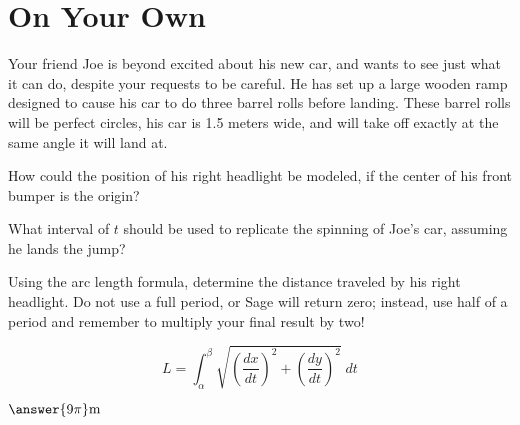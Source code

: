 \documentclass{ximera}
\begin{document}
\section{On Your Own}
\begin{question}
\item Your friend Joe is beyond excited about his new car, and wants to see just what it can do, despite your requests to be careful. He has set up a large wooden ramp designed to cause his car to do three barrel rolls before landing. These barrel rolls will be perfect circles, his car is 1.5 meters wide, and will take off exactly at the same angle it will land at.

How could the position of his right headlight be modeled, if the center of his front bumper is the origin?

\begin{multipleChoice}
\end{multipleChoice}

What interval of $t$ should be used to replicate the spinning of Joe's car, assuming he lands the jump?

\begin{multipleChoice}
\end{multipleChoice}

Using the arc length formula, determine the distance traveled by his right headlight. Do not use a full period, or Sage will return zero; instead, use half of a period and remember to multiply your final result by two!

$$L = \int_\alpha^\beta \sqrt{\left(\dfrac{dx}{dt}\right)^2 + \left(\dfrac{dy}{dt}\right)^2} \;dt$$

\begin{onlineOnly}
\begin{sageCell}

\end{sageCell}
\end{onlineOnly}
\begin{center}
$\answer{9\pi}\text{m}$
\end{center}
\end{question}
\end{document}

